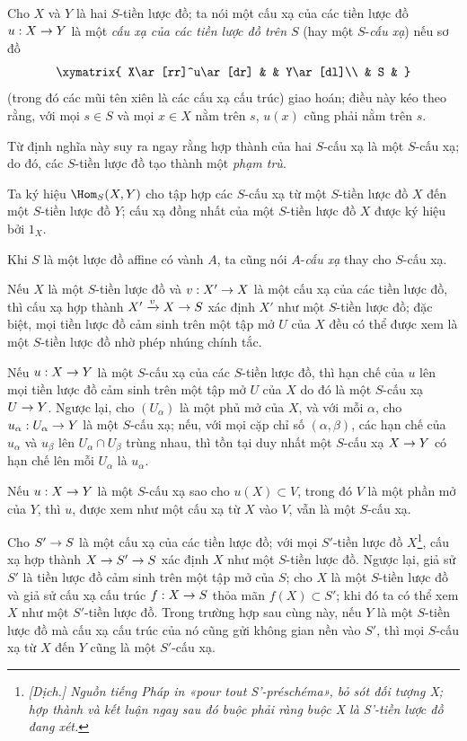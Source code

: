 \documentclass[oneside]{amsart}
\makeatletter
\newcommand{\ega@arrow}[2]{\mathchoice{#1}{#2}{#2}{#2}}
\renewcommand{\to}{\ega@arrow{\longrightarrow}{\rightarrow}}
\newcommand{\oldpage}[2][]{{\marginnote{\normalfont\textbf{#1}~|~#2}}\ignorespaces}
\let\EGAOriginalLabel\label
\renewcommand{\label}[1]{\phantomsection\EGAOriginalLabel{#1}}
\makeatother
\begin{document}
\begin{env}[2.5.2]
\label{I.2.5.2}
Cho $X$ và $Y$ là hai $S$-tiền lược đồ; ta nói một cấu xạ của các tiền lược đồ $u:X\to Y$ là một \emph{cấu xạ của các tiền lược đồ trên $S$} (hay một $S$-\emph{cấu xạ}) nếu sơ đồ
\label{I.2.5.2.diagram}
\[
  \xymatrix{
    X\ar[rr]^u\ar[dr] & & Y\ar[dl]\\
    & S &
  }
\]
(trong đó các mũi tên xiên là các cấu xạ cấu trúc) giao hoán; điều này kéo theo rằng, với mọi $s\in S$ và mọi $x\in X$ nằm trên $s$, $u(x)$ cũng phải nằm trên $s$.
\end{env}

Từ định nghĩa này suy ra ngay rằng hợp thành của hai $S$-cấu xạ là một $S$-cấu xạ; do đó, các $S$-tiền lược đồ tạo thành một \emph{phạm trù}.

Ta ký hiệu $\Hom_S(X,Y)$ cho tập hợp các $S$-cấu xạ từ một $S$-tiền lược đồ $X$ đến một $S$-tiền lược đồ $Y$; cấu xạ đồng nhất của một $S$-tiền lược đồ $X$ được ký hiệu bởi $1_X$.

Khi $S$ là một lược đồ affine có vành $A$, ta cũng nói $A$-\emph{cấu xạ} thay cho $S$-cấu xạ.

\begin{env}[2.5.3]
\label{I.2.5.3}
\oldpage[I]{104}
Nếu $X$ là một $S$-tiền lược đồ và $v:X'\to X$ là một cấu xạ của các tiền lược
đồ, thì cấu xạ hợp thành $X'\xrightarrow{v}X\to S$ xác định $X'$ như một
$S$-tiền lược đồ; đặc biệt, mọi tiền lược đồ cảm sinh trên một tập mở $U$ của
$X$ đều có thể được xem là một $S$-tiền lược đồ nhờ phép nhúng chính tắc.

Nếu $u:X\to Y$ là một $S$-cấu xạ của các $S$-tiền lược đồ, thì hạn chế của $u$
lên mọi tiền lược đồ cảm sinh trên một tập mở $U$ của $X$ do đó là một
$S$-cấu xạ $U\to Y$. Ngược lại, cho $(U_\alpha)$ là một phủ mở của $X$, và với
mỗi $\alpha$, cho $u_\alpha:U_\alpha\to Y$ là một $S$-cấu xạ; nếu, với mọi cặp
chỉ số $(\alpha,\beta)$, các hạn chế của $u_\alpha$ và $u_\beta$ lên
$U_\alpha\cap U_\beta$ trùng nhau, thì tồn tại duy nhất một $S$-cấu xạ
$X\to Y$ có hạn chế lên mỗi $U_\alpha$ là $u_\alpha$.

Nếu $u:X\to Y$ là một $S$-cấu xạ sao cho $u(X)\subset V$, trong đó $V$ là một
phần mở của $Y$, thì $u$, được xem như một cấu xạ từ $X$ vào $V$, vẫn là một
$S$-cấu xạ.
\end{env}

\begin{env}[2.5.4]
\label{I.2.5.4}
Cho $S'\to S$ là một cấu xạ của các tiền lược đồ; với mọi $S'$-tiền lược đồ
$X$\footnote{\emph{[Dịch.] Nguồn tiếng Pháp in «pour tout S'-préschéma», bỏ
sót đối tượng X; hợp thành và kết luận ngay sau đó buộc phải ràng buộc X là
S'-tiền lược đồ đang xét.}}, cấu xạ hợp thành $X\to S'\to S$ xác định $X$ như
một $S$-tiền lược đồ.
Ngược lại, giả sử $S'$ là tiền lược đồ cảm sinh trên một tập mở của $S$; cho
$X$ là một $S$-tiền lược đồ và giả sử cấu xạ cấu trúc $f:X\to S$ thỏa mãn
$f(X)\subset S'$; khi đó ta có thể xem $X$ như một $S'$-tiền lược đồ. Trong
trường hợp sau cùng này, nếu $Y$ là một $S$-tiền lược đồ mà cấu xạ cấu trúc của
nó cũng gửi không gian nền vào $S'$, thì mọi $S$-cấu xạ từ $X$ đến $Y$ cũng là
một $S'$-cấu xạ.
\end{env}
\end{document}
